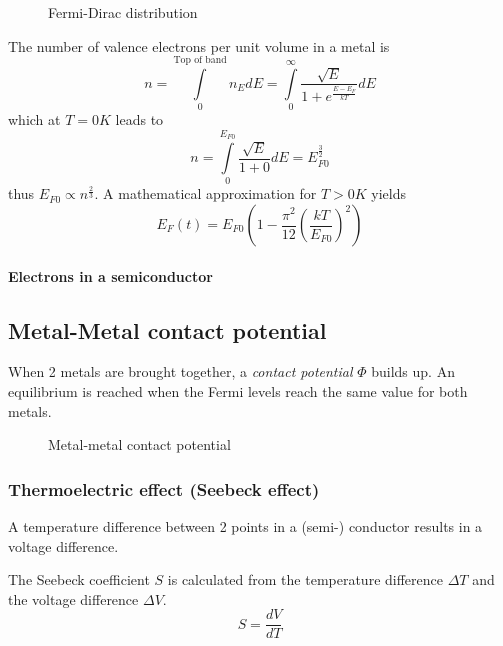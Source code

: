 \begin{figure}[ht!]
    \centering
    
    \caption{Fermi-Dirac distribution}
\end{figure}


The number of valence electrons per unit volume in a metal is
\begin{equation}
    n = \int\limits_{0}^{\text{Top of band}} n_E dE = \int\limits_{0}^{\infty} \frac{\sqrt{E}}{1 + e^{\frac{E-E_F}{kT}}} dE
\end{equation}
which at $T=0K$ leads to
\begin{equation}
    n = \int\limits_{0}^{E_{F0}} \frac{\sqrt{E}}{1+0} dE = E_{F0}^{\frac{3}{2}}
\end{equation}
thus $E_{F0} \propto n^{\frac{2}{3}}$.
A mathematical approximation for $T > 0K$ yields
\begin{equation}
    E_F(t) = E_{F0} \left( 1 - \frac{\pi^2}{12} \left( \frac{kT}{E_{F0}} \right)^2 \right)
\end{equation}

\paragraph{Electrons in a semiconductor}

\subsection{Metal-Metal contact potential}
When 2 metals are brought together, a \emph{contact potential} $\Phi$ builds up.
An equilibrium is reached when the Fermi levels reach the same value for both metals.

\begin{figure}[ht!]
    \centering
    
    \caption{Metal-metal contact potential}
\end{figure}

\subsubsection{Thermoelectric effect (Seebeck effect)}
A temperature difference between 2 points in a (semi-) conductor results in a voltage difference.

The Seebeck coefficient $S$ is calculated from the temperature difference $\Delta T$ and the voltage difference $\Delta V$.
\begin{equation}
    S = \frac{dV}{dT}
\end{equation}

